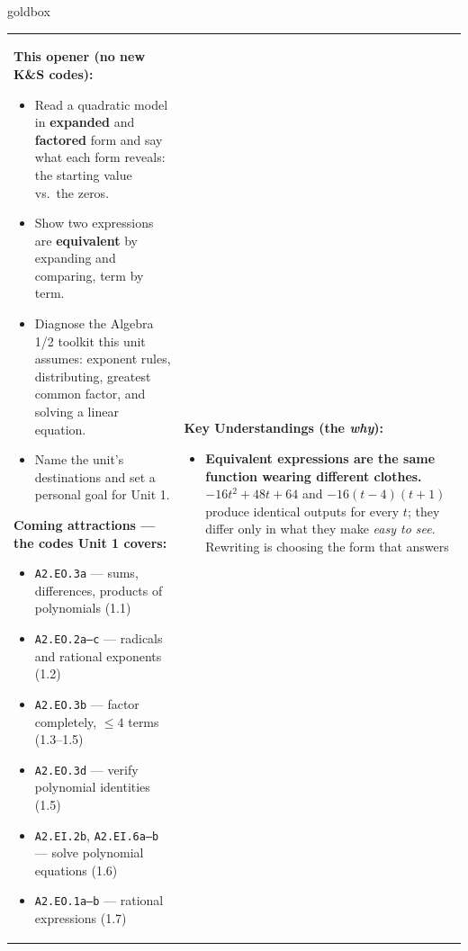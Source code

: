 \documentclass[10pt]{article}
\begin{document}
\renewcommand{\arraystretch}{1.6}
\begin{skillbox}{goldbox}
\begin{tabularx}{\linewidth}{@{}X|X@{}}
\begin{minipage}[t]{\linewidth}\vspace{0pt}
\textbf{This opener (no new K\&S codes):}
\begin{itemize}[leftmargin=1.1em, itemsep=2pt, topsep=2pt]
  \item Read a quadratic model in \textbf{expanded} and \textbf{factored} form and say what each
        form reveals: the starting value vs.\ the zeros.
  \item Show two expressions are \textbf{equivalent} by expanding and comparing, term by term.
  \item Diagnose the Algebra 1/2 toolkit this unit assumes: exponent rules, distributing,
        greatest common factor, and solving a linear equation.
  \item Name the unit's destinations and set a personal goal for Unit 1.
\end{itemize}
\textbf{Coming attractions --- the codes Unit 1 covers:}
\begin{itemize}[leftmargin=1.1em, itemsep=2pt, topsep=2pt]
  \item \texttt{A2.EO.3a} --- sums, differences, products of polynomials (1.1)
  \item \texttt{A2.EO.2a--c} --- radicals and rational exponents (1.2)
  \item \texttt{A2.EO.3b} --- factor completely, $\le 4$ terms (1.3--1.5)
  \item \texttt{A2.EO.3d} --- verify polynomial identities (1.5)
  \item \texttt{A2.EI.2b}, \texttt{A2.EI.6a--b} --- solve polynomial equations (1.6)
  \item \texttt{A2.EO.1a--b} --- rational expressions (1.7)
\end{itemize}
\end{minipage}
&
\begin{minipage}[t]{\linewidth}\vspace{0pt}
\textbf{Key Understandings (the \emph{why}):}
\begin{itemize}[leftmargin=1.1em, itemsep=2pt, topsep=2pt]
  \item \textbf{Equivalent expressions are the same function wearing different clothes.}
        $-16t^2+48t+64$ and $-16(t-4)(t+1)$ produce identical outputs for every $t$; they differ
        only in what they make \emph{easy to see}. Rewriting is choosing the form that answers

\end{itemize}
\end{minipage}
\end{tabularx}
\end{skillbox}
\end{document}
